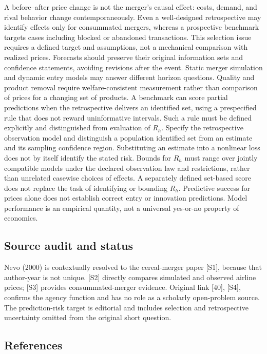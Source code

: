 \documentclass[11pt,a4paper]{article}
\begin{document}
A before--after price change is not the merger's causal effect: costs, demand, and rival behavior change contemporaneously. Even a well-designed retrospective may identify effects only for consummated mergers, whereas a prospective benchmark targets cases including blocked or abandoned transactions. This selection issue requires a defined target and assumptions, not a mechanical comparison with realized prices. Forecasts should preserve their original information sets and confidence statements, avoiding revisions after the event. Static merger simulation and dynamic entry models may answer different horizon questions. Quality and product removal require welfare-consistent measurement rather than comparison of prices for a changing set of products. A benchmark can score partial predictions when the retrospective delivers an identified set, using a prespecified rule that does not reward uninformative intervals. Such a rule must be defined explicitly and distinguished from evaluation of $R_h$. Specify the retrospective observation model and distinguish a population identified set from an estimate and its sampling confidence region. Substituting an estimate into a nonlinear loss does not by itself identify the stated risk. Bounds for $R_h$ must range over jointly compatible models under the declared observation law and restrictions, rather than unrelated casewise choices of effects. A separately defined set-based score does not replace the task of identifying or bounding $R_h$. Predictive success for prices alone does not establish correct entry or innovation predictions. Model performance is an empirical quantity, not a universal yes-or-no property of economics.

\subsection*{Source audit and status}

Nevo (2000) is contextually resolved to the cereal-merger paper [S1], because that author-year is not unique. [S2] directly compares simulated and observed airline prices; [S3] provides consummated-merger evidence. Original link [40], [S4], confirms the agency function and has no role as a scholarly open-problem source. The prediction-risk target is editorial and includes selection and retrospective uncertainty omitted from the original short question.

\subsection*{References}
\end{document}
